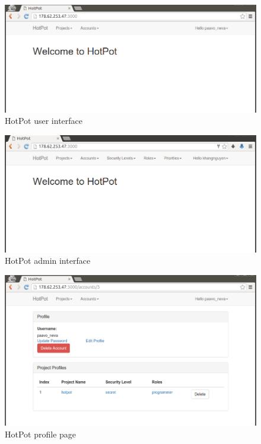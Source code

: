 \begin{figure}[bth]                                                                                                                                                  \myfloatalign
\includegraphics[width=1.0\linewidth]{gfx/chapter_5/general/user_interface}
\caption[HotPot user interface]{HotPot user interface}
\label{fig:user_guide:user_interface}
\end{figure}

\begin{figure}[bth]                                                                                                                                                  \myfloatalign
\includegraphics[width=1.0\linewidth]{gfx/chapter_5/general/admin_interface}
\caption[HotPot admin interface]{HotPot admin interface}
\label{fig:user_guide:admin_interface}
\end{figure}

\begin{figure}[bth]                                                                                                                                                  \myfloatalign
\includegraphics[width=1.0\linewidth]{gfx/chapter_5/general/profile}
\caption[HotPot profile page]{HotPot profile page}
\label{fig:user_guide:profile}
\end{figure}

